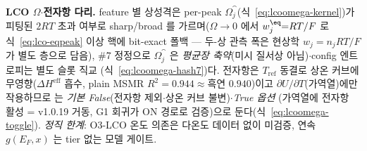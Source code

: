 \begin{keybox}
\textbf{LCO $\Omega$$\cdot$전자항 다리.} feature 별 상성격은 per-peak $\Omega_j^\cat$(식~\eqref{eq:lcoomega-kernel})가
피팅된 $2RT$ 초과 여부로 sharp/broad 를 가르며($\Omega\!\to\!0$ 에서 $w_j^{\eq}{=}RT/F$ 로 식~\eqref{eq:lco-eqpeak}
이상 핵에 bit-exact 폴백 --- 두-상 관측 폭은 현상학 $w_j{=}n_jRT/F$ 가 별도 층으로 담음), \#7 정정으로
$\Omega_j^\cat$ 은 \emph{평균장 축약}(미시 질서상 아님)$\cdot$config 엔트로피는 별도 슬롯 직교
(식~\eqref{eq:lcoomega-hash7})다. 전자항은 $T_\mathrm{ref}$ 동결로 상온 커브에 무영향($\Delta H^\mathrm{eff}$
흡수, plain MSMR $R^2{=}0.944\!\approx\!$흑연 $0.940$)이고 $\partial U/\partial T$(가역열)에만 작용하므로
 는 \emph{기본 False}(전자항 제외$\cdot$상온 커브 불변)$\cdot$\emph{True 옵션}
(가역열에 전자항 활성 = v1.0.19 거동, G1 회귀가 ON 경로로 검증)으로 둔다(식~\eqref{eq:lcoomega-toggle}).
\emph{정직 한계}: O3-LCO 온도 의존은 다온도 데이터 없이 미검증, 연속 $g(E_F,x)$ 는 tier 없는 모델 게이트.
\end{keybox}

